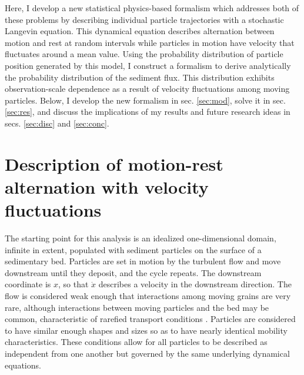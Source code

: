 Here, I develop a new statistical physics-based formalism which addresses both of these problems by describing individual particle trajectories with a stochastic Langevin equation.
This dynamical equation describes alternation between motion and rest at random intervals while particles in motion have velocity that fluctuates around a mean value.
Using the probability distribution of particle position generated by this model, I construct a formalism to derive analytically the probability distribution of the sediment flux.
This distribution exhibits observation-scale dependence as a result of velocity fluctuations among moving particles.
Below, I develop the new formalism in sec. \ref{sec:mod}, solve it in sec. \ref{sec:res}, and discuss the implications of my results and future research ideas in secs. \ref{sec:disc} and \ref{sec:conc}.

\section{Description of motion-rest alternation with velocity fluctuations \label{sec:mod}}
The starting point for this analysis is an idealized one-dimensional domain, infinite in extent, populated with sediment particles on the surface of a sedimentary bed.
Particles are set in motion by the turbulent flow and move downstream until they deposit, and the cycle repeats.
The downstream coordinate is $x$, so that $\dot{x}$ describes a velocity in the downstream direction.
The flow is considered weak enough that interactions among moving grains are very rare, although interactions between moving particles and the bed may be common, characteristic of rarefied transport conditions \citep[e.g.][]{Kumaran2006,Furbish2017}. 
Particles are considered to have similar enough shapes and sizes so as to have nearly identical mobility characteristics.
These conditions allow for all particles to be described as independent from one another but governed by the same underlying dynamical equations.

